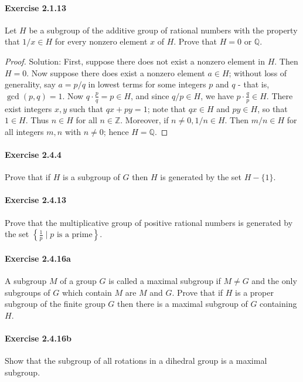 \documentclass{article}
\theoremstyle{definition}
\begin{document}
\paragraph{Exercise 2.1.13} Let $H$ be a subgroup of the additive group of rational numbers with the property that $1 / x \in H$ for every nonzero element $x$ of $H$. Prove that $H=0$ or $\mathbb{Q}$.
\begin{proof}
    Solution: First, suppose there does not exist a nonzero element in $H$. Then $H=0$.
Now suppose there does exist a nonzero element $a \in H$; without loss of generality, say $a=p / q$ in lowest terms for some integers $p$ and $q$ - that is, $\operatorname{gcd}(p, q)=1$. Now $q \cdot \frac{p}{q}=p \in H$, and since $q / p \in H$, we have $p \cdot \frac{q}{p} \in H$. There exist integers $x, y$ such that $q x+p y=1$; note that $q x \in H$ and $p y \in H$, so that $1 \in H$. Thus $n \in H$ for all $n \in \mathbb{Z}$. Moreover, if $n \neq 0,1 / n \in H$. Then $m / n \in H$ for all integers $m, n$ with $n \neq 0$; hence $H=\mathbb{Q}$.
\end{proof}


\paragraph{Exercise 2.4.4} Prove that if $H$ is a subgroup of $G$ then $H$ is generated by the set $H-\{1\}$.

\paragraph{Exercise 2.4.13} Prove that the multiplicative group of positive rational numbers is generated by the set $\left\{\frac{1}{p} \mid \text{$p$ is a prime} \right\}$.

\paragraph{Exercise 2.4.16a} A subgroup $M$ of a group $G$ is called a maximal subgroup if $M \neq G$ and the only subgroups of $G$ which contain $M$ are $M$ and $G$. Prove that if $H$ is a proper subgroup of the finite group $G$ then there is a maximal subgroup of $G$ containing $H$.

\paragraph{Exercise 2.4.16b} Show that the subgroup of all rotations in a dihedral group is a maximal subgroup.
\end{document}
